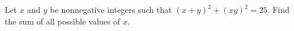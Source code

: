 Let $x$ and $y$ be nonnegative integers such that $(x+y)^2+(xy)^2=25$. Find the sum of all possible values of $x$.
